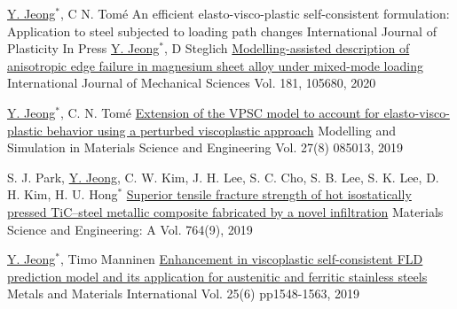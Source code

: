 
\begin{cventries}
  \cventry
  {\underline{Y. Jeong}$^*$, C N. Tom\'{e}}
  {An efficient elasto-visco-plastic self-consistent formulation: Application to steel subjected to loading path changes}
  {International Journal of Plasticity}
  {In Press}
  {
  }
  \cventry
  {\underline{Y. Jeong}$^*$, D Steglich}
  {\href{https://doi.org/10.1016/j.ijmecsci.2020.105680}{Modelling-assisted description of anisotropic edge failure in magnesium sheet alloy under mixed-mode loading}}
  {International Journal of Mechanical Sciences}
  {Vol. 181, 105680, 2020}
  {
  }

  \cventry
  {\underline{Y. Jeong}$^*$, C. N. Tom\'{e}}
  {\href{https://doi.org/10.1088/1361-651X/ab4b66}{Extension of the VPSC model to account for elasto-visco-plastic behavior using a perturbed viscoplastic approach}}
  {Modelling and Simulation in Materials Science and Engineering}
  {Vol. 27(8) 085013, 2019}
  {
  }

  \cventry
  {S. J. Park, \underline{Y. Jeong}, C. W. Kim, J. H. Lee, S. C. Cho, S. B. Lee, S. K. Lee, D. H. Kim, H. U. Hong$^*$}
  {\href{https://doi.org/10.1016/j.msea.2019.138260}{Superior tensile fracture strength of hot isostatically pressed TiC–steel metallic composite fabricated by a novel infiltration}}
  {Materials Science and Engineering: A}
  {Vol. 764(9), 2019}
  {
  }

  \cventry
  {\underline{Y. Jeong}$^*$, Timo Manninen}
  {\href{https://doi.org/10.1007/s12540-019-00292-5}{Enhancement in viscoplastic self-consistent FLD prediction model and its application for austenitic and ferritic stainless steels}}
  {Metals and Materials International}
  {Vol. 25(6) pp1548-1563, 2019}
  {
  }


\end{cventries}

